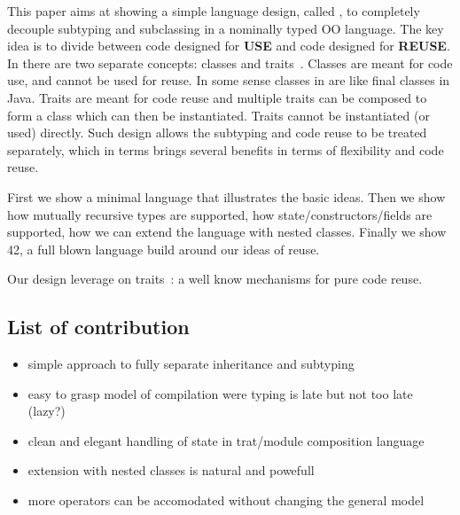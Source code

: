This paper aims at showing a simple language design, called \name, to
completely decouple subtyping and subclassing in a nominally typed OO
language. The key idea is to divide between code designed for
\textbf{USE} and code designed for \textbf{REUSE}. 
In \name there are two separate concepts: classes
and traits~\cite{}. Classes are meant for code use, and cannot be used
for reuse. In some sense classes in \name are like final classes in
Java. Traits are meant for code reuse and multiple traits can be
composed to form a class which can then be instantiated. Traits 
cannot be instantiated (or used) directly. Such design allows the
subtyping and code reuse to be treated separately, which in terms 
brings several benefits in terms of flexibility and code reuse.

First we show a minimal language that illustrates the basic ideas. 
Then we show how mutually recursive types
are supported, how state/constructors/fields are supported,
how we can extend the language with nested classes.
Finally we show 42, a full blown language build around our ideas of
reuse.

Our design leverage on traits~\cite{ducasse2006traits}: a well know mechanisms for pure
code reuse.


\subsection{List of contribution}
\begin{itemize}
\item simple approach to fully separate inheritance and subtyping
\item easy to grasp model of compilation were typing is late but not
  too late (lazy?)
\item clean and elegant handling of state in trat/module composition language
\item extension with nested classes is natural and
  powefull
\item more operators can be accomodated without changing the general model
\end{itemize}






